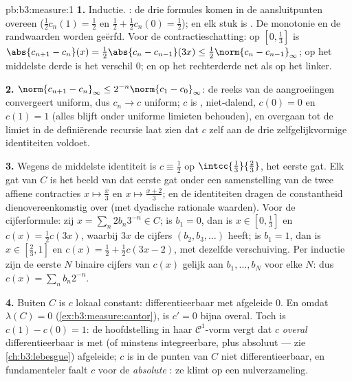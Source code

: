 \begin{solution}{pb:b3:measure:1}
\textbf{1.} Inductie. : de drie formules komen in de
aansluitpunten overeen ($\frac12c_n(1) = \frac12$ en $\frac12 +
\frac12c_n(0) = \frac12$); en elk stuk is . De monotonie en
de randwaarden worden geërfd. Voor de contractieschatting: op
$[0,\frac13]$ is $\abs{c_{n+1} - c_n}(x) = \frac12\abs{c_n -
c_{n-1}}(3x) \leq \frac12\norm{c_n - c_{n-1}}_\infty$; op het
middelste derde is het verschil $0$; en op het rechterderde net
als op het linker.

\textbf{2.} $\norm{c_{n+1} - c_n}_\infty \leq 2^{-n}\norm{c_1 -
c_0}_\infty$: de reeks van de aangroeiingen convergeert uniform,
dus $c_n \to c$ uniform; $c$ is , niet-dalend, $c(0) = 0$
en $c(1) = 1$ (alles blijft onder uniforme limieten behouden), en
overgaan tot de limiet in de definiërende recursie laat zien dat
$c$ zelf aan de drie zelfgelijkvormige identiteiten voldoet.

\textbf{3.} Wegens de middelste identiteit is $c \equiv \frac12$
op $\intcc{\frac13}{\frac23}$, het eerste gat. Elk gat van $C$ is
het beeld van dat eerste gat onder een samenstelling van de twee
affiene contracties $x \mapsto \frac x3$ en $x\mapsto\frac{x +
2}3$; en de identiteiten dragen de constantheid
dienovereenkomstig over (met dyadische rationale waarden). Voor de
cijferformule: zij $x = \sum_n 2b_n3^{-n} \in C$; is $b_1 = 0$,
dan is $x \in [0,\frac13]$ en $c(x) = \frac12c(3x)$, waarbij $3x$
de cijfers $(b_2, b_3, \dots)$ heeft; is $b_1 = 1$, dan is $x \in
[\frac23, 1]$ en $c(x) = \frac12 + \frac12c(3x - 2)$, met dezelfde
verschuiving. Per inductie zijn de eerste $N$ binaire cijfers van
$c(x)$ gelijk aan $b_1, \dots, b_N$ voor elke $N$: dus $c(x) =
\sum_nb_n2^{-n}$.

\textbf{4.} Buiten $C$ is $c$ lokaal constant: differentieerbaar
met afgeleide $0$. En omdat $\lambda(C) = 0$
(\cref{ex:b3:measure:cantor}), is $c' = 0$ bijna overal. Toch is
$c(1) - c(0) = 1$: de hoofdstelling in haar
$\mathcal C^1$-vorm vergt dat $c$ \emph{overal} differentieerbaar
is met  (of minstens integreerbare, plus absoluut
 --- zie \cref{ch:b3:lebesgue}) afgeleide; $c$ is in de
punten van $C$ niet differentieerbaar, en fundamenteler faalt $c$
voor de \emph{absolute }: ze klimt op een
nulverzameling.


\end{solution}
